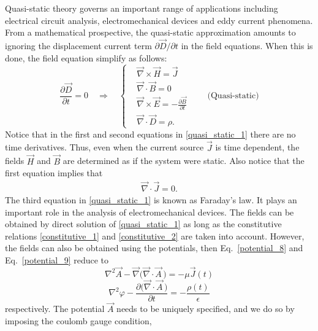 \documentclass[12pt,a4paper,oneside]{book}
\begin{document}
\begin{onehalfspace}
Quasi-static theory governs an important range of applications including electrical circuit analysis, electromechanical devices and eddy current phenomena. From a mathematical prospective, the quasi-static approximation amounts to ignoring the displacement current term $\partial \vec{D}/\partial t$ in the field equations. When this is done, the field equation simplify as follows:
\begin{equation}\label{quasi_static_1}
	\frac{\partial\vec{D}}{\partial t} = 0\quad\Rightarrow\quad\left\lbrace 
	\begin{aligned}
		&\vec{\nabla}\times\vec{H}=\vec{J}\\[8pt]
		&\vec{\nabla}\cdot\vec{B}=0\\[8pt]
		&\vec{\nabla}\times\vec{E}=-\frac{\partial\vec{B}}{\partial t}\\[8pt]
		&\vec{\nabla}\cdot\vec{D}=\rho.
	\end{aligned}\right. \qquad\text{(Quasi-static)}
\end{equation}
Notice that in the first and second equations in \ref{quasi_static_1} there are no time derivatives. Thus, even when the current source $\vec{J}$ is time dependent, the fields $\vec{H}$ and $\vec{B}$ are determined as if the system were static. Also notice that the first equation implies that
\begin{equation*}\label{}
	\begin{aligned}
		\vec{\nabla}\cdot\vec{J}=0.
	\end{aligned}
\end{equation*}
The third equation in \ref{quasi_static_1} is known as Faraday's law. It plays an important role in the analysis of electromechanical devices. The fields can be obtained by direct solution of \ref{quasi_static_1} as long as the constitutive relations \ref{constitutive_1} and \ref{constitutive_2} are taken into account. However, the fields can also be obtained using the potentials, then Eq.~\eqref{potential_8} and Eq.~\eqref{potential_9} reduce to 
\begin{equation}\label{quasi_static_2}
	\nabla^2\vec{A} - \vec{\nabla}\big(\vec{\nabla}\cdot\vec{A}\,\big) = -\mu\vec{J}(t)
\end{equation}
\begin{equation}\label{quasi_static_3}
	\nabla^2\varphi - \frac{\partial \big(\vec{\nabla}\cdot\vec{A}\,\big)}{\partial t} = -\frac{\rho(t)}{\epsilon}
\end{equation}
respectively. The potential $\vec{A}$ needs to be uniquely specified, and we do so by imposing the coulomb gauge condition,

\end{onehalfspace}
\end{document}
